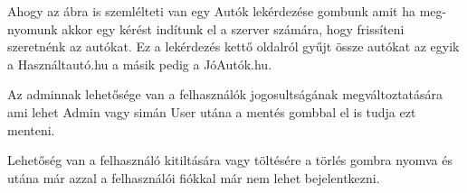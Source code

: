 Ahogy az ábra is szemlélteti van egy Autók lekérdezése gombunk amit ha meg-
nyomunk  akkor egy kérést indítunk el a szerver számára, hogy frissíteni szeretnénk az autókat. Ez a lekérdezés kettő oldalról gyűjt össze autókat az egyik a Használtautó.hu a másik pedig a JóAutók.hu.

Az adminnak lehetősége van a felhasználók jogosultságának megváltoztatására ami lehet Admin vagy simán User utána a mentés gombbal el is tudja ezt menteni.

Lehetőség van a felhasználó kitiltására vagy töltésére a törlés gombra nyomva és utána már azzal a felhasználói fiókkal már nem lehet bejelentkezni.


